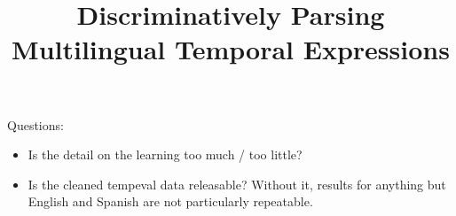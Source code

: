 \documentclass[11pt,letterpaper]{article}
\title{Discriminatively Parsing Multilingual Temporal Expressions}
\author{ 
}
\date{}
\begin{document}
\maketitle

Questions:
\begin{itemize}
\item Is the detail on the learning too much / too little?
\item Is the cleaned tempeval data releasable? Without it, results for
      anything but English and Spanish are not particularly repeatable.
\end{itemize}












\end{document}
